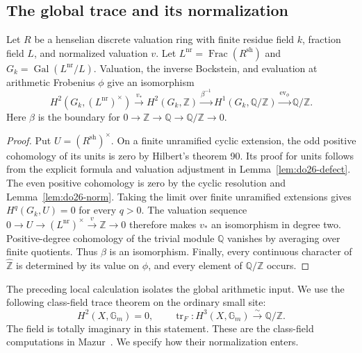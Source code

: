 \subsection{The global trace and its normalization}

\begin{lemma}
\label{lem:do26-local-invariant}
Let \(R\) be a henselian discrete valuation ring with finite residue
field \(k\), fraction field \(L\), and normalized valuation \(v\).
Let \(L^{\mathrm{nr}}=\operatorname{Frac}(R^{\mathrm{sh}})\) and
\(G_k=\operatorname{Gal}(L^{\mathrm{nr}}/L)\).
Valuation, the inverse Bockstein, and evaluation at arithmetic Frobenius
\(\phi\) give an isomorphism
\[
 H^2(G_k,(L^{\mathrm{nr}})^\times)
 \xrightarrow{v_*}H^2(G_k,\mathbb Z)
 \xrightarrow{\beta^{-1}}H^1(G_k,\mathbb Q/\mathbb Z)
 \xrightarrow{\operatorname{ev}_{\phi}}\mathbb Q/\mathbb Z.
\]
Here \(\beta\) is the boundary for
\(0\to\mathbb Z\to\mathbb Q\to\mathbb Q/\mathbb Z\to0\).
\end{lemma}

\begin{proof}
Put \(U=(R^{\mathrm{sh}})^\times\).  On a finite unramified cyclic
extension, the odd positive cohomology of its units is zero by Hilbert's
theorem 90.  Its proof for units follows from the explicit formula and
valuation adjustment in Lemma~\ref{lem:do26-defect}.  The even positive
cohomology is zero by the cyclic resolution and
Lemma~\ref{lem:do26-norm}.  Taking the limit over finite unramified
extensions gives \(H^q(G_k,U)=0\) for every \(q>0\).
The valuation sequence
\(0\to U\to(L^{\mathrm{nr}})^\times\xrightarrow{v}\mathbb Z\to0\)
therefore makes \(v_*\) an isomorphism in degree two.
Positive-degree cohomology of the trivial module \(\mathbb Q\)
vanishes by averaging over finite quotients.  Thus \(\beta\) is an
isomorphism.  Finally, every continuous character of
\(\widehat{\mathbb Z}\) is determined by its value on \(\phi\),
and every element of \(\mathbb Q/\mathbb Z\) occurs.
\end{proof}

The preceding local calculation isolates the global arithmetic input.
We use the following class-field trace theorem on the ordinary small site:
\begin{equation}
\label{eq:do26-trace-input}
 H^2(X,\mathbb G_m)=0,\qquad
 \operatorname{tr}_F:H^3(X,\mathbb G_m)
                   \xrightarrow{\sim}\mathbb Q/\mathbb Z.
\end{equation}
The field is totally imaginary in this statement.  These are the
class-field computations in Mazur~\cite[\S2,
(2.1)--(2.3), pp.~537--538]{Mazur1973}.  We specify how their normalization enters.

